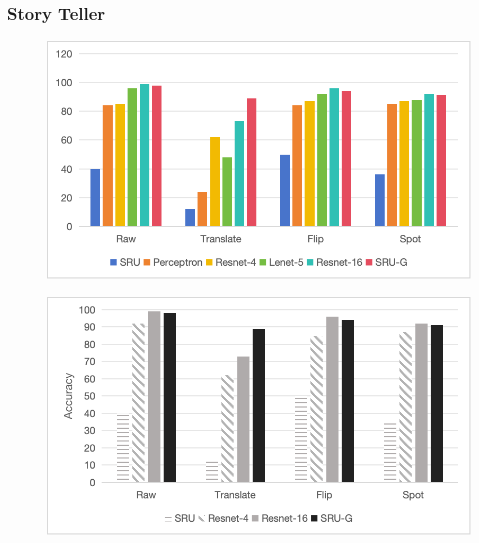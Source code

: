 \documentclass{beamer}
\begin{document}
  \begin{frame}
      \frametitle{Story Teller}
      \begin{minipage}{0.48\textwidth}
          \begin{figure}
              \centering
              \includegraphics[width=\textwidth]{fig-2.png}
          \end{figure}
      \end{minipage}
      \hfill
      \begin{minipage}{0.48\textwidth}
          \begin{figure}
              \centering
              \includegraphics[width=\textwidth]{fig-3.png}
          \end{figure}
      \end{minipage}
  \end{frame}
  
\end{document}
